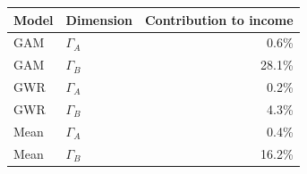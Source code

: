 \begin{tabular}{llr}
\hline
Model & Dimension & Contribution to income \\
\hline
GAM & $\Gamma_A$ & 0.6\% \\
GAM & $\Gamma_B$ & 28.1\% \\
GWR & $\Gamma_A$ & 0.2\% \\
GWR & $\Gamma_B$ & 4.3\% \\
Mean & $\Gamma_A$ & 0.4\% \\
Mean & $\Gamma_B$ & 16.2\% \\
\hline
\end{tabular}
